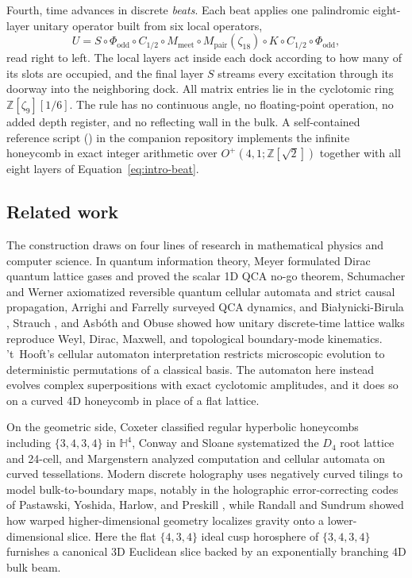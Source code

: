 Fourth, time advances in discrete \emph{beats}. Each beat applies one palindromic eight-layer unitary operator built from six
local operators,
\begin{equation}
U = S \circ \Phi_{\mathrm{odd}} \circ C_{1/2} \circ M_{\mathrm{meet}} \circ M_{\mathrm{pair}}(\zeta_{18}) \circ K \circ C_{1/2} \circ \Phi_{\mathrm{odd}},
\label{eq:intro-beat}
\end{equation}
read right to left. The local layers act inside each dock according to how many of its slots are occupied, and the
final layer $S$ streams every excitation through its doorway into the neighboring dock. All matrix entries lie in the
cyclotomic ring $\mathbb{Z}[\zeta_9][1/6]$. The rule has no continuous angle, no floating-point operation, no added
depth register, and no reflecting wall in the bulk. A self-contained reference script (\universecode) in the companion
repository \cite{cluesurf2026repo} implements the infinite honeycomb in exact integer arithmetic over
$O^+(4,1; \mathbb{Z}[\sqrt{2}])$ together with all eight layers of Equation~\eqref{eq:intro-beat}.

\subsection*{Related work}

The construction draws on four lines of research in mathematical physics and computer science. In quantum
information theory, Meyer \cite{meyer1996} formulated Dirac quantum lattice gases and proved the scalar 1D QCA no-go
theorem, Schumacher and Werner \cite{schumacher2004} axiomatized reversible quantum cellular automata and strict causal
propagation, Arrighi \cite{arrighi2019} and Farrelly \cite{farrelly2020} surveyed QCA dynamics, and
Bia\l ynicki-Birula \cite{bialynicki1994}, Strauch \cite{strauch2006}, and Asb\'oth and Obuse \cite{asboth2013} showed
how unitary discrete-time lattice walks reproduce Weyl, Dirac, Maxwell, and topological boundary-mode kinematics.
't~Hooft's cellular automaton interpretation \cite{thooft2016} restricts microscopic evolution to deterministic
permutations of a classical basis. The automaton here instead evolves complex superpositions with exact cyclotomic
amplitudes, and it does so on a curved 4D honeycomb in place of a flat lattice.

On the geometric side, Coxeter \cite{coxeter1956, coxeter1973} classified regular hyperbolic honeycombs including
$\{3,4,3,4\}$ in $\mathbb{H}^4$, Conway and Sloane \cite{conway1999} systematized the $D_4$ root lattice and 24-cell,
and Margenstern \cite{margenstern2007vol1} analyzed computation and cellular automata on curved tessellations. Modern
discrete holography uses negatively curved tilings to model bulk-to-boundary maps, notably in the holographic
error-correcting codes of Pastawski, Yoshida, Harlow, and Preskill \cite{pastawski2015happy}, while Randall and Sundrum
\cite{randall1999} showed how warped higher-dimensional geometry localizes gravity onto a lower-dimensional slice. Here
the flat $\{4,3,4\}$ ideal cusp horosphere of $\{3,4,3,4\}$ furnishes a canonical 3D Euclidean slice backed by an
exponentially branching 4D bulk beam.


